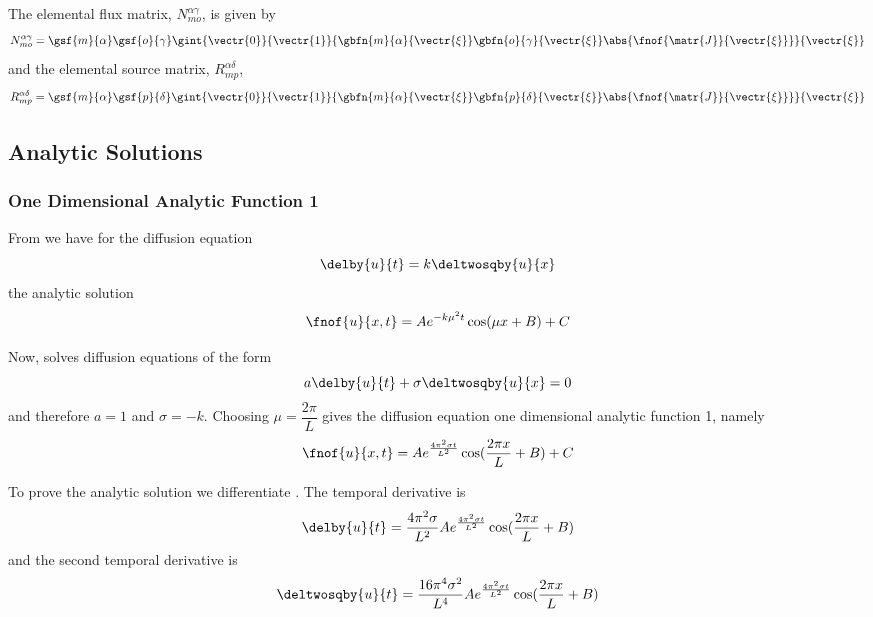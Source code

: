 The elemental flux matrix, $N^{\alpha\gamma}_{mo}$, is given by
\begin{equation}
  N^{\alpha\gamma}_{mo} =\gsf{m}{\alpha}\gsf{o}{\gamma}
  \gint{\vectr{0}}{\vectr{1}}{\gbfn{m}{\alpha}{\vectr{\xi}}\gbfn{o}{\gamma}{\vectr{\xi}}
    \abs{\fnof{\matr{J}}{\vectr{\xi}}}}{\vectr{\xi}}
\end{equation}
and the elemental source matrix, $R^{\alpha\delta}_{mp}$, 
\begin{equation}
  R^{\alpha\delta}_{mp}=\gsf{m}{\alpha}\gsf{p}{\delta}
  \gint{\vectr{0}}{\vectr{1}}{\gbfn{m}{\alpha}{\vectr{\xi}}\gbfn{p}{\delta}{\vectr{\xi}}
    \abs{\fnof{\matr{J}}{\vectr{\xi}}}}{\vectr{\xi}}
\end{equation}

\subsection{Analytic Solutions}
\label{subsec:DiffusionEquationAnalyticSolutions}

\subsubsection{One Dimensional Analytic Function 1}

From  we have for the \oned diffusion equation
\begin{equation}
  \delby{u}{t}=k\deltwosqby{u}{x}
\end{equation}
the analytic solution
\begin{equation}
  \fnof{u}{x,t}=Ae^{-k\mu^{2}t}\cos(\mu x + B) + C
\end{equation}

Now, \OpenCMISS solves diffusion equations of the form
\begin{equation}
  a\delby{u}{t}+\sigma\deltwosqby{u}{x}=0
  \label{eqn:OpenCMISSDiffusionEquationOneDim1}
\end{equation}
and therefore $a=1$ and $\sigma=-k$. Choosing $\mu=\dfrac{2\pi}{L}$ gives the
\OpenCMISS diffusion equation one dimensional analytic function 1, namely
\begin{equation}
  \fnof{u}{x,t}=Ae^{\frac{4\pi^{2}\sigma t}{L^{2}}}\cos(\frac{2\pi x}{L} + B) + C
  \label{eqn:OpenCMISSAnalyticDiffusionEquationOneDim1}
\end{equation}

To prove the analytic solution we differentiate
. The temporal derivative is
\begin{equation}
  \delby{u}{t} = \dfrac{4\pi^{2}\sigma}{L^{2}}Ae^{\frac{4\pi^{2}\sigma t}{L^{2}}}\cos(\frac{2\pi x}{L} + B) 
  \label{eqn:AnalyticDiffusionEquationOneDim1Velocity}
\end{equation}
and the second temporal derivative is
\begin{equation}
  \deltwosqby{u}{t} = \dfrac{16\pi^{4}\sigma^{2}}{L^{4}}Ae^{\frac{4\pi^{2}\sigma t}{L^{2}}}\cos(\frac{2\pi x}{L} + B) 
  \label{eqn:AnalyticDiffusionEquationOneDim1Acceleration}
\end{equation}

